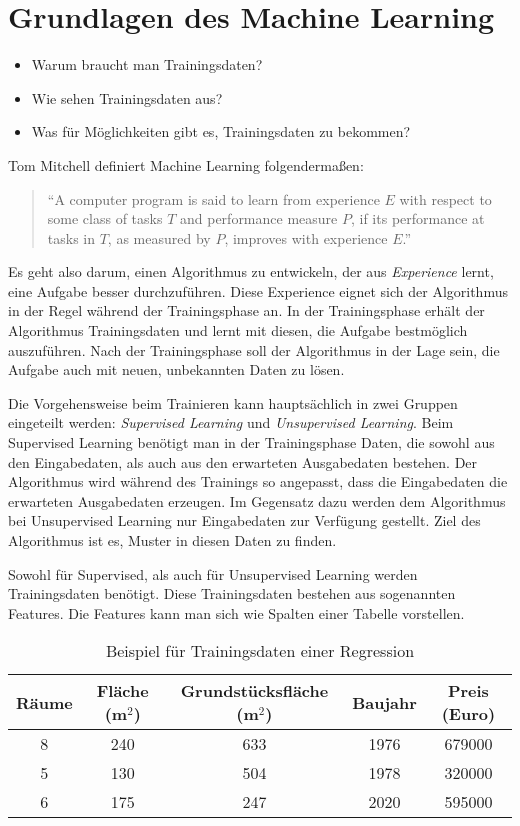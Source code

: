 
\chapter{Grundlagen des Machine Learning}

\begin{itemize}
    \item Warum braucht man Trainingsdaten?
    \item Wie sehen Trainingsdaten aus?
    \item Was für Möglichkeiten gibt es, Trainingsdaten zu bekommen?
\end{itemize}

Tom Mitchell definiert Machine Learning folgendermaßen:
\begin{quote}
    \enquote{A computer program is said to learn from experience $E$ with respect to some class of tasks $T$ and performance measure $P$, if its performance at tasks in $T$, as measured by $P$, improves with experience $E$.} \cite{mitchell1997}
\end{quote}

Es geht also darum, einen Algorithmus zu entwickeln, der aus \textit{Experience} lernt, eine Aufgabe besser durchzuführen. Diese Experience eignet sich der Algorithmus in der Regel während der Trainingsphase an. In der Trainingsphase erhält der Algorithmus Trainingsdaten und lernt mit diesen, die Aufgabe bestmöglich auszuführen. Nach der Trainingsphase soll der Algorithmus in der Lage sein, die Aufgabe auch mit neuen, unbekannten Daten zu lösen.

Die Vorgehensweise beim Trainieren kann hauptsächlich in zwei Gruppen eingeteilt werden: \textit{Supervised Learning} und \textit{Unsupervised Learning}. Beim Supervised Learning benötigt man in der Trainingsphase Daten, die sowohl aus den Eingabedaten, als auch aus den erwarteten Ausgabedaten bestehen. Der Algorithmus wird während des Trainings so angepasst, dass die Eingabedaten die erwarteten Ausgabedaten erzeugen. Im Gegensatz dazu werden dem Algorithmus bei Unsupervised Learning nur Eingabedaten zur Verfügung gestellt. Ziel des Algorithmus ist es, Muster in diesen Daten zu finden.

Sowohl für Supervised, als auch für Unsupervised Learning werden Trainingsdaten benötigt. Diese Trainingsdaten bestehen aus sogenannten Features. Die Features kann man sich wie Spalten einer Tabelle vorstellen.

\begin{table}[H]
    \centering
    \begin{tabular}{ || c | c | c | c || c || }
        \hline
        Räume & Fläche (m$^2$) & Grundstücksfläche (m$^2$) & Baujahr & Preis (Euro) \\
        \hline
        8 & 240 & 633 & 1976 & 679000 \\
        5 & 130 & 504 & 1978 & 320000 \\
        6 & 175 & 247 & 2020 & 595000 \\
        \hline
    \end{tabular}
    \caption{Beispiel für Trainingsdaten einer Regression}
    \label{tbl:trainingdata}
\end{table}